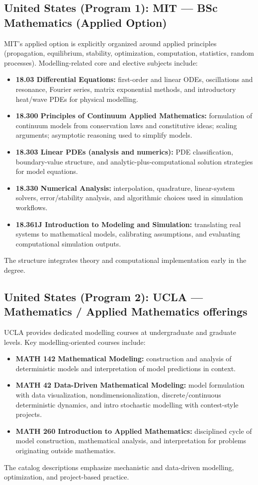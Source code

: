 ﻿\documentclass[11pt,a4paper]{article}
\begin{document}
\subsection*{United States (Program 1): MIT --- BSc Mathematics (Applied Option)}
MIT's applied option is explicitly organized around applied principles (propagation, equilibrium, stability, optimization, computation, statistics, random processes). Modelling-related core and elective subjects include:
\begin{itemize}[leftmargin=*]
  \item \textbf{18.03 Differential Equations:} first-order and linear ODEs, oscillations and resonance, Fourier series, matrix exponential methods, and introductory heat/wave PDEs for physical modelling.
  \item \textbf{18.300 Principles of Continuum Applied Mathematics:} formulation of continuum models from conservation laws and constitutive ideas; scaling arguments; asymptotic reasoning used to simplify models.
  \item \textbf{18.303 Linear PDEs (analysis and numerics):} PDE classification, boundary-value structure, and analytic-plus-computational solution strategies for model equations.
  \item \textbf{18.330 Numerical Analysis:} interpolation, quadrature, linear-system solvers, error/stability analysis, and algorithmic choices used in simulation workflows.
  \item \textbf{18.361J Introduction to Modeling and Simulation:} translating real systems to mathematical models, calibrating assumptions, and evaluating computational simulation outputs.
\end{itemize}
The structure integrates theory and computational implementation early in the degree.

\subsection*{United States (Program 2): UCLA --- Mathematics / Applied Mathematics offerings}
UCLA provides dedicated modelling courses at undergraduate and graduate levels. Key modelling-oriented courses include:
\begin{itemize}[leftmargin=*]
  \item \textbf{MATH 142 Mathematical Modeling:} construction and analysis of deterministic models and interpretation of model predictions in context.
  \item \textbf{MATH 42 Data-Driven Mathematical Modeling:} model formulation with data visualization, nondimensionalization, discrete/continuous deterministic dynamics, and intro stochastic modelling with contest-style projects.
  \item \textbf{MATH 260 Introduction to Applied Mathematics:} disciplined cycle of model construction, mathematical analysis, and interpretation for problems originating outside mathematics.
\end{itemize}
The catalog descriptions emphasize mechanistic and data-driven modelling, optimization, and project-based practice.
\end{document}
